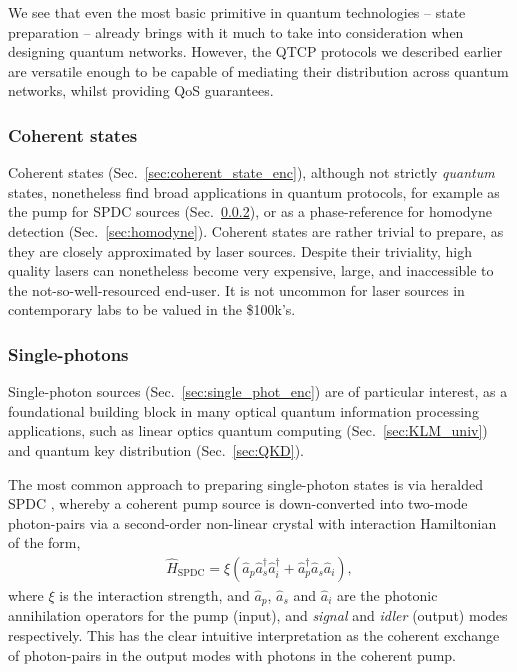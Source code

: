 \documentclass[aps, rmp, twocolumn, amsmath, amssymb, nofootinbib, superscriptaddress, longbibliography, floatfix, table-of-contents, eqsecnum]{revtex4-1}
\begin{document}
We see that even the most basic primitive in quantum technologies -- state preparation -- already brings with it much to take into consideration when designing quantum networks. However, the QTCP protocols we described earlier are versatile enough to be capable of mediating their distribution across quantum networks, whilst providing QoS guarantees.

%
%

\subsubsection{Coherent states} \label{sec:coherent_states} 

Coherent states (Sec.~\ref{sec:coherent_state_enc}), although not strictly \textit{quantum} states, nonetheless find broad applications in quantum protocols, for example as the pump for SPDC sources (Sec.~\ref{sec:single_phot_src}), or as a phase-reference for homodyne detection (Sec.~\ref{sec:homodyne}). Coherent states are rather trivial to prepare, as they are closely approximated by laser sources. Despite their triviality, high quality lasers can nonetheless become very expensive, large, and inaccessible to the not-so-well-resourced end-user. It is not uncommon for laser sources in contemporary labs to be valued in the \$100k's.

%
%

\subsubsection{Single-photons} \label{sec:single_phot_src} 

Single-photon sources (Sec.~\ref{sec:single_phot_enc}) \cite{bib:Oxborrow05} are of particular interest, as a foundational building block in many optical quantum information processing applications, such as linear optics quantum computing (Sec.~\ref{sec:KLM_univ}) and quantum key distribution (Sec.~\ref{sec:QKD}).

The most common approach to preparing single-photon states is via heralded SPDC \cite{bib:URen03, bib:URen05}, whereby a coherent pump source is down-converted into two-mode photon-pairs via a second-order non-linear crystal with interaction Hamiltonian of the form,
\begin{align}
\hat{H}_\text{SPDC} = \xi(\hat{a}_p\hat{a}_s^\dag\hat{a}_i^\dag + \hat{a}_p^\dag\hat{a}_s\hat{a}_i),
\end{align}
where $\xi$ is the interaction strength, and $\hat{a}_p$, $\hat{a}_s$ and $\hat{a}_i$ are the photonic annihilation operators for the pump (input), and \textit{signal} and \textit{idler} (output) modes respectively. This has the clear intuitive interpretation as the coherent exchange of photon-pairs in the output modes with photons in the coherent pump.
\end{document}
